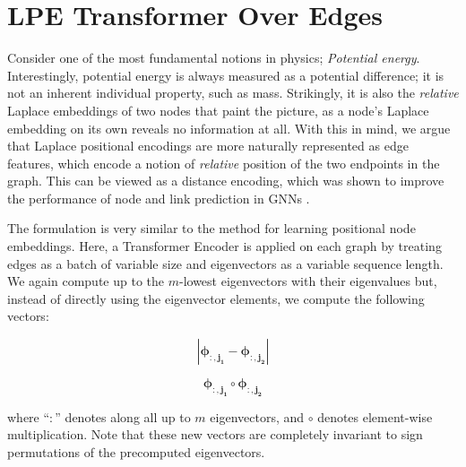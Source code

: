 \documentclass{article}
\def\eigvec{{\bm{\phi}}}
\begin{document}


\clearpage
\newpage

\appendix

\section{LPE Transformer Over Edges}
\label{app:lpe-edges}

Consider one of the most fundamental notions in physics; \textit{Potential energy}. Interestingly, potential energy is always measured as a potential difference; it is not an inherent individual property, such as mass. Strikingly, it is also the \textit{relative} Laplace embeddings of two nodes that paint the picture, as a node's Laplace embedding on its own reveals no information at all. With this in mind, we argue that Laplace positional encodings are more naturally represented as edge features, which encode a notion of \textit{relative} position of the two endpoints in the graph. This can be viewed as a distance encoding, which was shown to improve the performance of node and link prediction in GNNs \cite{li_distance_2020}.


The formulation is very similar to the method for learning positional node embeddings. Here, a Transformer Encoder is applied on each graph by treating edges as a batch of variable size and eigenvectors as a variable sequence length. We again compute up to the $m$-lowest eigenvectors with their eigenvalues but, instead of directly using the eigenvector elements, we compute the following vectors:

\noindent\begin{minipage}{.5\linewidth}
\begin{equation}
  |\boldsymbol{\eigvec_{:, j_1}} - \boldsymbol{\eigvec_{:, j_2}}|
\end{equation}
\end{minipage}%
\begin{minipage}{.5\linewidth}
\begin{equation}
  \boldsymbol{\eigvec_{:, j_1}} \circ \boldsymbol{\eigvec_{:, j_2}}
\end{equation}
\end{minipage}

where ``$:$'' denotes along all up to $m$ eigenvectors, and $\circ$ denotes element-wise multiplication. Note that these new vectors are completely invariant to sign permutations of the precomputed eigenvectors.
\end{document}
